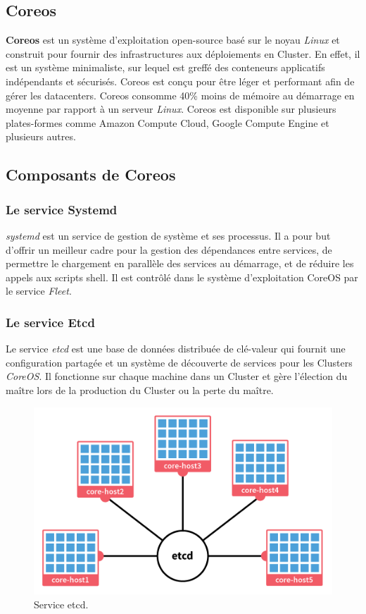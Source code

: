 \begin{onehalfspace}
\section{Coreos}
\textbf{Coreos} est un système d'exploitation open-source basé sur le noyau \emph{Linux} et construit pour fournir des infrastructures aux déploiements en Cluster. En effet, il est un système minimaliste, sur lequel est greffé des conteneurs applicatifs indépendants et sécurisés. Coreos est conçu pour être léger et performant afin de gérer les datacenters. Coreos consomme 40\% moins de mémoire au démarrage en moyenne par rapport à un serveur \emph{Linux}. Coreos est disponible sur plusieurs plates-formes comme Amazon Compute Cloud, Google Compute Engine et plusieurs autres.
\subsection{Composants de Coreos}
\subsubsection*{Le service Systemd}
\emph{systemd} est un service de gestion de système et ses processus. Il a pour but d'offrir un meilleur cadre pour la gestion des dépendances entre services, de permettre le chargement en parallèle des services au démarrage, et de réduire les appels aux scripts shell. Il est contrôlé dans le système d'exploitation CoreOS par le service \emph{Fleet}.
\subsubsection*{Le service Etcd}
Le service \emph{etcd} est une base de données distribuée de clé-valeur qui fournit une configuration partagée et un système de découverte de services pour les Clusters \emph{CoreOS}. Il fonctionne sur chaque machine dans un Cluster et gère l'élection du maître lors de la production du Cluster ou la perte du maître.
\begin{figure}[H]
\centering
\includegraphics [scale=0.4]{chapitre3/assets/etcd-cluster.png}
\caption{Service etcd.}
\end{figure}

\end{onehalfspace}
